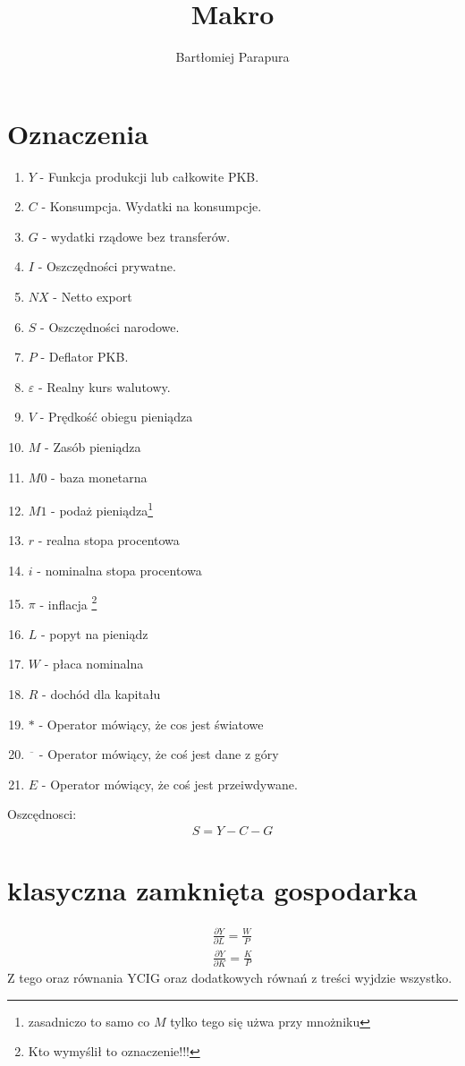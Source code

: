 \documentclass{article}
\title{Makro}
\author{Bartłomiej Parapura}
\begin{document}
\maketitle
\section{Oznaczenia}
\begin{enumerate}
    \item \(Y\) - Funkcja produkcji lub całkowite PKB.
    \item \(C\) - Konsumpcja. Wydatki na konsumpcje.
    \item \(G\) - wydatki rządowe bez transferów.
    \item \(I\) - Oszczędności prywatne.
    \item \(NX\) - Netto export
    \item \(S\) - Oszczędności narodowe.
    \item \(P\) - Deflator PKB.
    \item \(\varepsilon\) - Realny kurs walutowy.
    \item \(V\) - Prędkość obiegu pieniądza
    \item \(M\) - Zasób pieniądza
    \item \(M0\) - baza monetarna
    \item \(M1\) - podaż pieniądza\footnote{zasadniczo to samo co \(M\) tylko tego się użwa przy mnożniku}
    \item \(r\) - realna stopa procentowa
    \item \(i\) - nominalna stopa procentowa
    \item \(\pi\) - inflacja \footnote{Kto wymyślił to oznaczenie!!!}
    \item \(L\) - popyt na pieniądz
    \item \(W\) - płaca nominalna
    \item \(R\) - dochód dla kapitału
    \item \(*\) - Operator mówiący, że cos jest światowe
    \item \(\overline{\phantom{a}}\) - Operator mówiący, że coś jest dane z góry
    \item \(E\) - Operator mówiący, że coś jest przeiwdywane.
\end{enumerate}
Oszcędnosci:
\begin{gather}
    S = Y - C - G
\end{gather}
\section{klasyczna zamknięta gospodarka}
\begin{gather}
    \frac{\partial Y}{\partial L} = \frac{W}{P}\\
    \frac{\partial Y}{\partial K} = \frac{K}{P}
\end{gather}
Z tego oraz równania YCIG oraz dodatkowych równań z treści wyjdzie wszystko.
\end{document}
